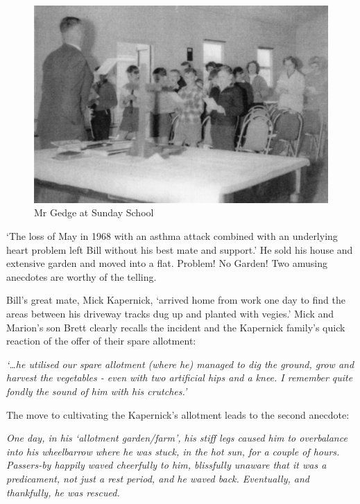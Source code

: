 \begin{figure}
\begin{center}
\includegraphics[width=1.\linewidth,center]{../images/gedgeSundaySchool.jpg}
\caption{Mr Gedge at Sunday School}
\end{center}
\end{figure}




`The loss of May in 1968 with an asthma attack combined with an underlying heart problem left Bill without his best mate and support.' He sold his house and extensive garden and moved into a flat. Problem! No Garden! Two amusing anecdotes are worthy of the telling.



Bill's great mate, Mick Kapernick, `arrived home from work one day to find the areas between his driveway tracks dug up and planted with vegies.' Mick and Marion's son Brett clearly recalls the incident and the Kapernick family's quick reaction of the offer of their spare allotment:



\emph{`\ldots he utilised our spare allotment (where he) managed to dig the ground, grow and harvest the vegetables - even with two artificial hips and a knee. I remember quite fondly the sound of him with his crutches.'}



The move to cultivating the Kapernick's allotment leads to the second anecdote:



\emph{One day, in his `allotment garden/farm', his stiff legs caused him to overbalance into his wheelbarrow where he was stuck, in the hot sun, for a couple of hours. Passers-by happily waved cheerfully to him, blissfully unaware that it was a predicament, not just a rest period, and he waved back. Eventually, and thankfully, he was rescued.}



